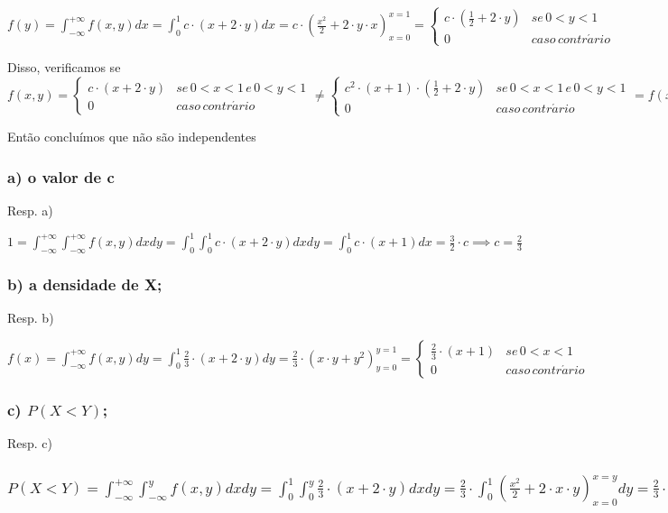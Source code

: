 \documentclass[portuguese]{article}
\begin{document}
$f(y)=\int_{-\infty}^{+\infty}f(x,y)dx=\int_{0}^{1}c\cdot(x+2\cdot y)dx=c\cdot(\frac{x^{2}}{2}+2\cdot y\cdot x)_{x=0}^{x=1}=\begin{cases}
c\cdot(\frac{1}{2}+2\cdot y) & se\,0<y<1\\
0 & caso\, contr\acute{a}rio
\end{cases}$

Disso, verificamos se $f(x,y)=\begin{cases}
c\cdot(x+2\cdot y) & se\,0<x<1\, e\,0<y<1\\
0 & caso\, contr\acute{a}rio
\end{cases}\neq\begin{cases}
c^{2}\cdot(x+1)\cdot(\frac{1}{2}+2\cdot y) & se\,0<x<1\, e\,0<y<1\\
0 & caso\, contr\acute{a}rio
\end{cases}=f(x)\cdot f(y)$

Então concluímos que não são independentes


\subsubsection*{\textmd{a) o valor de c}}

Resp. a)

$1=\int_{-\infty}^{+\infty}\int_{-\infty}^{+\infty}f(x,y)dxdy=\int_{0}^{1}\int_{0}^{1}c\cdot(x+2\cdot y)dxdy=\int_{0}^{1}c\cdot(x+1)dx=\frac{3}{2}\cdot c\implies c=\frac{2}{3}$


\subsubsection*{\textmd{b) a densidade de X; }}

Resp. b)

$f(x)=\int_{-\infty}^{+\infty}f(x,y)dy=\int_{0}^{1}\frac{2}{3}\cdot(x+2\cdot y)dy=\frac{2}{3}\cdot(x\cdot y+y^{2})_{y=0}^{y=1}=\begin{cases}
\frac{2}{3}\cdot(x+1) & se\,0<x<1\\
0 & caso\, contr\acute{a}rio
\end{cases}$


\subsubsection*{\textmd{c) $P(X<Y)$; }}

Resp. c)


\subsubsection*{\textmd{$P(X<Y)=\int_{-\infty}^{+\infty}\int_{-\infty}^{y}f(x,y)dxdy=\int_{0}^{1}\int_{0}^{y}\frac{2}{3}\cdot(x+2\cdot y)dxdy=\frac{2}{3}\cdot\int_{0}^{1}(\frac{x^{2}}{2}+2\cdot x\cdot y)_{x=0}^{x=y}dy=\frac{2}{3}\cdot\int_{0}^{1}\frac{5}{2}\cdot y^{2}dy=\frac{5}{3}\cdot\frac{y^{3}}{3}_{y=0}^{y=1}=\frac{5}{9}$}}
\end{document}
